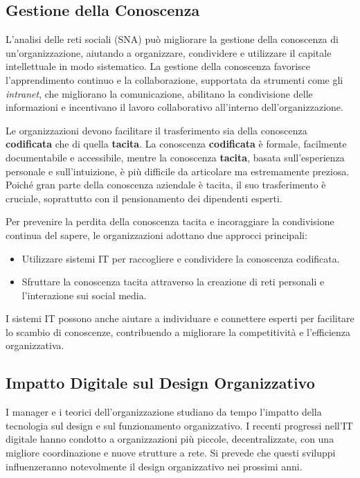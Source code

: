 \documentclass{article}
\begin{document}
\subsection{Gestione della Conoscenza}

L'analisi delle reti sociali (SNA) può migliorare la gestione della conoscenza di un'organizzazione, aiutando a organizzare, condividere e utilizzare il capitale intellettuale in modo sistematico. La gestione della conoscenza favorisce l'apprendimento continuo e la collaborazione, supportata da strumenti come gli \textit{intranet}, che migliorano la comunicazione, abilitano la condivisione delle informazioni e incentivano il lavoro collaborativo all'interno dell'organizzazione.

Le organizzazioni devono facilitare il trasferimento sia della conoscenza \textbf{codificata} che di quella \textbf{tacita}. La conoscenza \textbf{codificata} è formale, facilmente documentabile e accessibile, mentre la conoscenza \textbf{tacita}, basata sull'esperienza personale e sull'intuizione, è più difficile da articolare ma estremamente preziosa. Poiché gran parte della conoscenza aziendale è tacita, il suo trasferimento è cruciale, soprattutto con il pensionamento dei dipendenti esperti.

Per prevenire la perdita della conoscenza tacita e incoraggiare la condivisione continua del sapere, le organizzazioni adottano due approcci principali: 
\begin{itemize}
    \item Utilizzare sistemi IT per raccogliere e condividere la conoscenza codificata.
    \item Sfruttare la conoscenza tacita attraverso la creazione di reti personali e l'interazione sui social media.
\end{itemize}

I sistemi IT possono anche aiutare a individuare e connettere esperti per facilitare lo scambio di conoscenze, contribuendo a migliorare la competitività e l'efficienza organizzativa.

\subsection{Impatto Digitale sul Design Organizzativo}

I manager e i teorici dell'organizzazione studiano da tempo l'impatto della tecnologia sul design e sul funzionamento organizzativo. I recenti progressi nell'IT digitale hanno condotto a organizzazioni più piccole, decentralizzate, con una migliore coordinazione e nuove strutture a rete. Si prevede che questi sviluppi influenzeranno notevolmente il design organizzativo nei prossimi anni.
\end{document}
